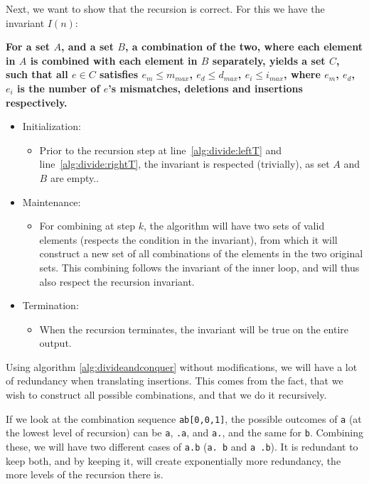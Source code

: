 \documentclass[12pt]{article}
\theoremstyle{definition}
\newcounter{subsubsubsection}[subsubsection]
\begin{document}
Next, we want to show that the recursion is correct. For this we have the invariant $I(n)$:

\textbf{For a set $A$, and a set $B$, a combination of the two, where each element in $A$ is combined with each element in $B$ separately, yields a set $C$, such that all $e \in C$ satisfies $e_m \leq m_{max}$, $e_d \leq d_{max}$, $e_i \leq i_{max}$, where $e_m$, $e_d$, $e_i$ is the number of $e$'s mismatches, deletions and insertions respectively.}


\begin{itemize}
\item Initialization:
\begin{itemize}
	\item[] Prior to the recursion step at line~\ref{alg:divide:leftT} and line~\ref{alg:divide:rightT}, the invariant is respected (trivially), as set $A$ and $B$ are empty..
\end{itemize}

\item Maintenance:
\begin{itemize}
	\item[] For combining at step $k$, the algorithm will have two sets of valid elements (respects the condition in the invariant), from which it will construct a new set of all combinations of the elements in the two original sets. This combining follows the invariant of the inner loop, and will thus also respect the recursion invariant.
\end{itemize}

\item Termination:
\begin{itemize}
	\item[] When the recursion terminates, the invariant will be true on the entire output.
\end{itemize}
\end{itemize}



Using algorithm \ref{alg:divideandconquer} without modifications, we will have a lot of redundancy when translating insertions. This comes from the fact, that we wish to construct all possible combinations, and that we do it recursively.

If we look at the combination sequence \texttt{ab[0,0,1]}, the possible outcomes of \texttt{a} (at the lowest level of recursion) can be \texttt{a}, \texttt{.a}, and \texttt{a.}, and the same for \texttt{b}. Combining these, we will have two different cases of \texttt{a.b} (\texttt{a. b} and \texttt{a .b}). It is redundant to keep both, and by keeping it, will create exponentially more redundancy, the more levels of the recursion there is.
\end{document}
